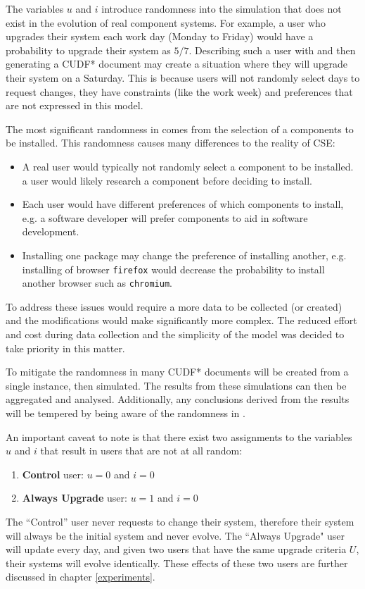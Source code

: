 The variables $u$ and $i$ introduce randomness into the simulation that does not exist in the evolution of real component systems.
For example, a user who upgrades their system each work day (Monday to Friday) would have a probability to upgrade their system as $5/7$.
Describing such a user with \usermodel and then generating a CUDF* document may create a situation where they will upgrade their system on a Saturday.
This is because users will not randomly select days to request changes, they have constraints (like the work week) and preferences that are not expressed in this model.

The most significant randomness in \usermodel comes from the selection of a components to be installed.
This randomness causes many differences to the reality of CSE:
\begin{itemize}
  \item A real user would typically not randomly select a component to be installed. a user would likely research a component before deciding to install.
  \item Each user would have different preferences of which components to install, e.g. a software developer will prefer components to aid in software development.
  \item Installing one package may change the preference of installing another, e.g. installing of browser \texttt{firefox} would decrease the probability to install another browser such as \texttt{chromium}.
\end{itemize}
To address these issues would require a more data to be collected (or created) and the modifications would make \usermodel significantly more complex.
The reduced effort and cost during data collection and the simplicity of the model was decided to take priority in this matter.

To mitigate the randomness in \usermodel many CUDF* documents will be created from a single \usermodel instance, then simulated.
The results from these simulations can then be aggregated and analysed.
Additionally, any conclusions derived from the results will be tempered by being aware of the randomness in \usermodel.

An important caveat to note is that there exist two assignments to the variables $u$ and $i$ that result in users that are not at all random:
\begin{enumerate}
  \item \textbf{Control} user: $u = 0$ and $i = 0$
  \item \textbf{Always Upgrade} user: $u = 1$ and $i = 0$
\end{enumerate}
The ``Control'' user never requests to change their system, therefore their system will always be the initial system and never evolve.
The ``Always Upgrade" user will update every day, and given two users that have the same upgrade criteria $U$, their systems will evolve identically.
These effects of these two users are further discussed in chapter \ref{experiments}.


